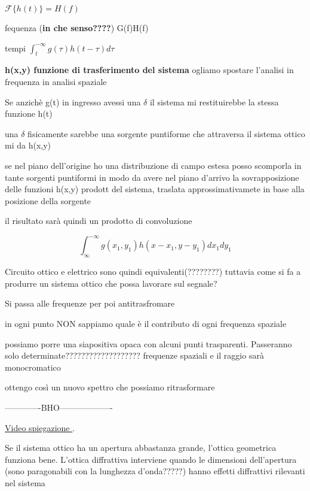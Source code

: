 \documentclass{article}
\begin{document}
$\mathscr{F} \{h(t)\}  = H(f)$

fequenza (\textbf{in che senso????})  G(f)H(f)

tempi $     \int_{t}^{-\infty}      g(\tau) h(t- \tau) d\tau         $


 \textbf{h(x,y) funzione di trasferimento del sistema}
ogliamo spostare l'analisi in frequenza in analisi spaziale 

Se anzichè g(t) in ingresso avessi una $\delta $ il sistema mi restituirebbe la stessa funzione h(t) 

una $\delta$ fisicamente sarebbe una sorgente puntiforme che attraversa il sistema ottico mi da h(x,y)

se nel piano dell'origine ho una distribuzione di campo estesa posso scomporla in tante sorgenti puntiformi in modo da avere nel piano d'arrivo la sovrapposizione delle funzioni h(x,y) prodott del sistema, traslata approssimativamete in base alla posizione della sorgente 

il risultato sarà quindi un prodotto di convoluzione 

\begin{equation}
\int_{\infty}^{-\infty} g(x_{1}, y_{1})h(x-x_{1}, y-y_{1})dx_{1} dy_{1}
\end{equation}

Circuito ottico e elettrico sono quindi equivalenti(????????) tuttavia come si fa a produrre un sistema ottico che possa lavorare sul segnale?

Si passa alle frequenze per poi antitrasfromare

in ogni punto NON sappiamo quale è il contributo di ogni frequenza spaziale 

possiamo porre una siapositiva opaca con alcuni punti trasparenti.
Passeranno solo determinate??????????????????? frequenze spaziali 
 e il raggio sarà monocromatico
 
 ottengo così un nuovo spettro che possiamo ritrasformare
 
-------------BHO-------------------




\href{https://www.youtube.com/watch?v=F-S0T4xTdLY}{Video spiegazione }.  %


Se il sistema ottico ha un apertura abbastanza grande, l'ottica geometrica funziona bene. L'ottica diffrattiva interviene quando le dimensioni dell'apertura (sono paragonabili con la lunghezza d'onda?????) hanno effetti diffrattivi rilevanti nel sistema
\end{document}
